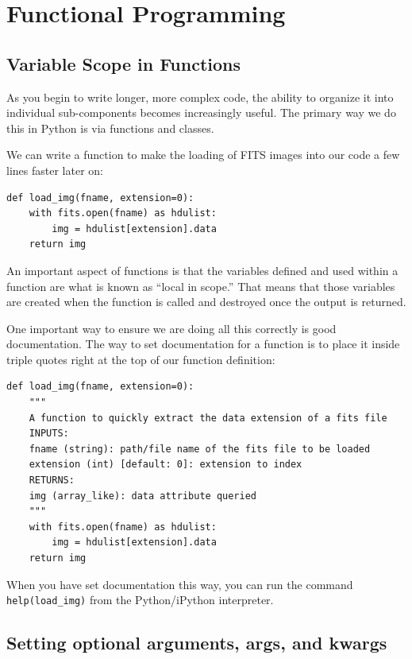 \chapter{Functional Programming} %

\section{Variable Scope in Functions} %
As you begin to write longer, more complex code, the ability to organize it into individual sub-components becomes increasingly useful. %
The primary way we do this in Python is via functions and classes. %

We can write a function to make the loading of FITS images into our code a few lines faster later on: %

\begin{lstlisting}
def load_img(fname, extension=0):
    with fits.open(fname) as hdulist:
        img = hdulist[extension].data
    return img
\end{lstlisting} %

An important aspect of functions is that the variables defined and used within a function are what is known as ``local in scope.'' %
That means that those variables are created when the function is called and destroyed once the output is returned. %

One important way to ensure we are doing all this correctly is good documentation. %
The way to set documentation for a function is to place it inside triple quotes right at the top of our function definition: %

\begin{lstlisting}
def load_img(fname, extension=0):
    """
    A function to quickly extract the data extension of a fits file
    INPUTS:
    fname (string): path/file name of the fits file to be loaded
    extension (int) [default: 0]: extension to index
    RETURNS:
    img (array_like): data attribute queried
    """
    with fits.open(fname) as hdulist:
        img = hdulist[extension].data
    return img
\end{lstlisting} %

When you have set documentation this way, you can run the command \texttt{help(load\_img)} from the Python/iPython interpreter. %

\section{Setting optional arguments, args, and kwargs} %
